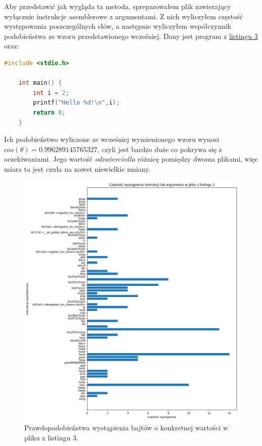 Aby przedstawić jak wygląda ta metoda, spreparowałem plik zawierający wyłącznie instrukcje asemblerowe z argumentami.
Z nich wyliczyłem częstość występowania poszczególnych słów, a następnie wyliczyłem współczynnik podobieństwa ze wzoru przedstawionego wcześniej. 
Dany jest program z \hyperref[lst:ello]{listingu 3} oraz:
\begin{lstlisting}[language=C,
    backgroundcolor=\color{EEGold!5!white},
    caption={Program podobny do programu z listingu 3. Jedyną różnicą jest obecność zmiennej $i$.},
    label={lst:helloC}]
    #include <stdio.h>

    int main() {
        int i = 2;
        printf("Hello %d!\n",i);
        return 0;
    }
\end{lstlisting}
Ich podobieństwo wyliczone ze wcześniej wymienionego wzoru wynosi $cos(\theta) = 0.996289145765327$, czyli jest bardzo duże co pokrywa się z oczekiwaniami.
Jego wartość \emph{odzwierciedla} różnicę pomiędzy dwoma plikami, więc miara ta jest czuła na nawet niewielkie zmiany.
\begin{figure}[H]
    \centering
    \includegraphics[width=0.69\linewidth]{rysunki/p1.png}
    \caption{Prawdopodobieństwa wystąpienia bajtów o konkretnej wartości w pliku z listingu 3.}
    \label{fig:enter-label}
\end{figure}

